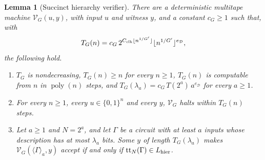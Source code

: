 \documentclass[11pt,letterpaper]{article}
\newtheorem{lemma}[theorem]{Lemma}
\theoremstyle{definition}
\theoremstyle{remark}
\newcommand{\poly}{\operatorname{poly}}
\begin{document}
\begin{lemma}[Succinct hierarchy verifier]
\label{tr:succinct}
There are a deterministic multitape machine $\mathcal V_G(u,y)$, with
input $u$ and witness $y$, and a constant $c_G\ge1$ such that, with
\[
 T_G(n)=c_G\,2^{C_{\rm clk}\lfloor n^{1/G'}\rfloor}
 \lfloor n^{1/G'}\rfloor^{e_{\mathcal D}},
\]
the following hold.
\begin{enumerate}[label=(\roman*)]
\item $T_G$ is nondecreasing, $T_G(n)\ge n$ for every $n\ge1$, $T_G(n)$
is computable from $n$ in $\poly(n)$ steps, and
$T_G(\lambda_a)=c_G\,T(2^a)\,a^{e_{\mathcal D}}$ for every $a\ge1$.
\item For every $n\ge1$, every $u\in\{0,1\}^n$ and every $y$,
$\mathcal V_G$ halts within $T_G(n)$ steps.
\item Let $a\ge1$ and $N=2^a$, and let $\Gamma$ be a circuit with at
least $a$ inputs whose description has at most $\lambda_a$ bits. Some
$y$ of length $T_G(\lambda_a)$ makes
$\mathcal V_G(\langle\Gamma\rangle_a,y)$ accept if and only if
$\mathrm{tt}_N(\Gamma)\in L_{\rm hier}$.
\end{enumerate}
\end{lemma}
\end{document}

